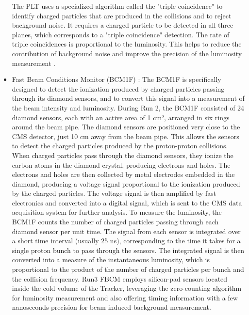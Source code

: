 \begin{itemize}
  The PLT uses a specialized algorithm called the "triple coincidence" to identify charged particles that are produced in the collisions and to reject background noise. It requires a charged particle to be detected in all three planes, which corresponds to a "triple coincidence" detection. The rate of triple coincidences is proportional to the luminosity. This helps to reduce the contribution of background noise and improve the precision of the luminosity measurement \cite{Lujan:2017kvh}.

\item Fast Beam Conditions Monitor (BCM1F) : The BCM1F is specifically designed to detect the ionization produced by charged particles passing through its diamond sensors, and to convert this signal into a measurement of the beam intensity and luminosity. During Run 2, the BCM1F consisted of 24 diamond sensors, each with an active area of 1 cm², arranged in six rings around the beam pipe. The diamond sensors are positioned very close to the CMS detector, just 10 cm away from the beam pipe. This allows the sensors to detect the charged particles produced by the proton-proton collisions. When charged particles pass through the diamond sensors, they ionize the carbon atoms in the diamond crystal, producing electrons and holes. The electrons and holes are then collected by metal electrodes embedded in the diamond, producing a voltage signal proportional to the ionization produced by the charged particles. The voltage signal is then amplified by fast electronics and converted into a digital signal, which is sent to the CMS data acquisition system for further analysis. To measure the luminosity, the BCM1F counts the number of charged particles passing through each diamond sensor per unit time. The signal from each sensor is integrated over a short time interval (usually 25 ns), corresponding to the time it takes for a single proton bunch to pass through the sensors. The integrated signal is then converted into a measure of the instantaneous luminosity, which is proportional to the product of the number of charged particles per bunch and the collision frequency. Run3 FBCM employs silicon-pad sensors located inside the cold volume of the Tracker, leveraging the zero-counting algorithm for luminosity measurement and also offering timing information with a few nanoseconds precision for beam-induced background measurement.


\end{itemize}
